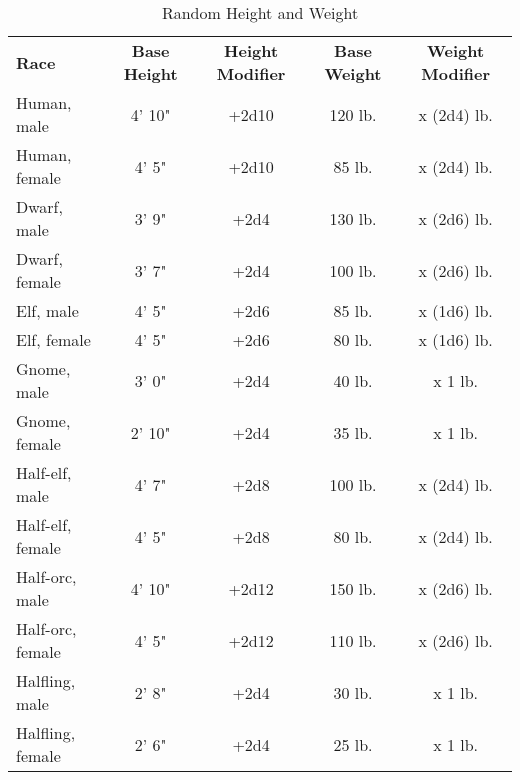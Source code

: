 \begin{table}[htb]
\caption{Random Height and Weight}
\centering
\begin{tabular}{l c c c c}
\textbf{Race} & \textbf{Base Height} & \textbf{Height Modifier} & \textbf{Base Weight} & \textbf{Weight Modifier}\\
Human, male & 4' 10" & +2d10 & 120 lb. & x (2d4) lb.\\
Human, female & 4' 5" & +2d10 & 85 lb. & x (2d4) lb.\\
Dwarf, male & 3' 9" & +2d4 & 130 lb. & x (2d6) lb.\\
Dwarf, female & 3' 7" & +2d4 & 100 lb. & x (2d6) lb.\\
Elf, male & 4' 5" & +2d6 & 85 lb. & x (1d6) lb.\\
Elf, female & 4' 5" & +2d6 & 80 lb. & x (1d6) lb.\\
Gnome, male & 3' 0" & +2d4 & 40 lb. & x 1 lb.\\
Gnome, female & 2' 10" & +2d4 & 35 lb. & x 1 lb.\\
Half-elf, male & 4' 7" & +2d8 & 100 lb. & x (2d4) lb.\\
Half-elf, female & 4' 5" & +2d8 & 80 lb. & x (2d4) lb.\\
Half-orc, male & 4' 10" & +2d12 & 150 lb. & x (2d6) lb.\\
Half-orc, female & 4' 5" & +2d12 & 110 lb. & x (2d6) lb.\\
Halfling, male & 2' 8" & +2d4 & 30 lb. & x 1 lb.\\
Halfling, female & 2' 6" & +2d4 & 25 lb. & x 1 lb.\\
\end{tabular}
\end{table}

